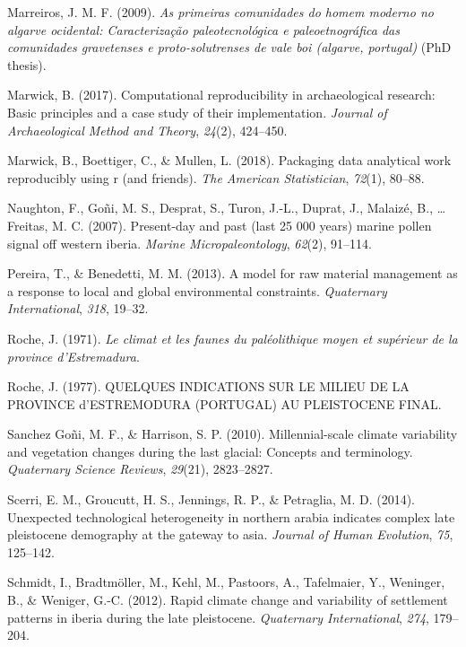 \documentclass[12pt,twoside]{reedthesis}
\begin{document}
\leavevmode\hypertarget{ref-marreiros2009}{}%
Marreiros, J. M. F. (2009). \emph{As primeiras comunidades do homem moderno no algarve ocidental: Caracterização paleotecnológica e paleoetnográfica das comunidades gravetenses e proto-solutrenses de vale boi (algarve, portugal)} (PhD thesis).

\leavevmode\hypertarget{ref-marwick2017}{}%
Marwick, B. (2017). Computational reproducibility in archaeological research: Basic principles and a case study of their implementation. \emph{Journal of Archaeological Method and Theory}, \emph{24}(2), 424--450.

\leavevmode\hypertarget{ref-marwick2018}{}%
Marwick, B., Boettiger, C., \& Mullen, L. (2018). Packaging data analytical work reproducibly using r (and friends). \emph{The American Statistician}, \emph{72}(1), 80--88.

\leavevmode\hypertarget{ref-naughton2007}{}%
Naughton, F., Goñi, M. S., Desprat, S., Turon, J.-L., Duprat, J., Malaizé, B., \ldots{} Freitas, M. C. (2007). Present-day and past (last 25 000 years) marine pollen signal off western iberia. \emph{Marine Micropaleontology}, \emph{62}(2), 91--114.

\leavevmode\hypertarget{ref-pereira2013}{}%
Pereira, T., \& Benedetti, M. M. (2013). A model for raw material management as a response to local and global environmental constraints. \emph{Quaternary International}, \emph{318}, 19--32.

\leavevmode\hypertarget{ref-roche1971}{}%
Roche, J. (1971). \emph{Le climat et les faunes du paléolithique moyen et supérieur de la province d'Estremadura}.

\leavevmode\hypertarget{ref-roche1977}{}%
Roche, J. (1977). QUELQUES INDICATIONS SUR LE MILIEU DE LA PROVINCE d'ESTREMODURA (PORTUGAL) AU PLEISTOCENE FINAL.

\leavevmode\hypertarget{ref-sanchez-goni2010}{}%
Sanchez Goñi, M. F., \& Harrison, S. P. (2010). Millennial-scale climate variability and vegetation changes during the last glacial: Concepts and terminology. \emph{Quaternary Science Reviews}, \emph{29}(21), 2823--2827.

\leavevmode\hypertarget{ref-scerri2014}{}%
Scerri, E. M., Groucutt, H. S., Jennings, R. P., \& Petraglia, M. D. (2014). Unexpected technological heterogeneity in northern arabia indicates complex late pleistocene demography at the gateway to asia. \emph{Journal of Human Evolution}, \emph{75}, 125--142.

\leavevmode\hypertarget{ref-schmidt2012}{}%
Schmidt, I., Bradtmöller, M., Kehl, M., Pastoors, A., Tafelmaier, Y., Weninger, B., \& Weniger, G.-C. (2012). Rapid climate change and variability of settlement patterns in iberia during the late pleistocene. \emph{Quaternary International}, \emph{274}, 179--204.
\end{document}
